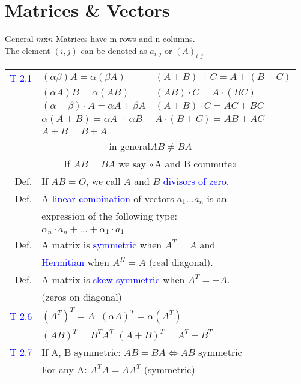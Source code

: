 \section{Matrices \& Vectors}
\begin{mainbox}{General}
$m$x$n$ Matrices have m rows and n columns.\\
The element $(i,j)$ can be denoted as $a_{i,j}$ or $(A)_{i,j}$
\smallskip\\
\setlength{\tabcolsep}{2pt}
\begin{tabular}{rll}
	\textcolor{blue}{T 2.1} & \multicolumn{1}{l|}{$(\alpha\beta)A = \alpha(\beta A)$} & $(A+B)+C = A+(B+C)$ \\
	& \multicolumn{1}{l|}{$(\alpha A)B = \alpha(AB)$} & $(AB)\cdot C = A\cdot (BC)$ \\
	& \multicolumn{1}{l|}{$(\alpha + \beta)\cdot A = \alpha A + \beta A$} & $(A+B)\cdot C = AC + BC$ \\
	& \multicolumn{1}{l|}{$\alpha (A+B) = \alpha A + \alpha B$} & $A\cdot (B+C) = AB+AC$ \\
	& \multicolumn{1}{l|}{$A+B = B+A$} & \\
	\multicolumn{3}{c}{\danger in general$AB \neq BA$}\\
	\multicolumn{3}{c}{If $AB = BA$ we say «A and B commute»}\\
	\rule{0pt}{3ex}
	Def. & \multicolumn{2}{l}{If $AB = O$, we call $A$ and $B$ \textcolor{blue}{divisors of zero}.}\\
	\rule{0pt}{3ex}
	Def. & \multicolumn{2}{l}{A \textcolor{blue}{linear combination} of vectors $a_1 ... a_n$ is an}\\
 	& \multicolumn{2}{l}{expression of the following type:}\\
 	& \multicolumn{2}{l}{$\alpha_n\cdot a_n + ... + \alpha_1\cdot a_1$}\\
 	\rule{0pt}{3ex}
	Def. & \multicolumn{2}{l}{A matrix is \textcolor{blue}{symmetric} when $A^T = A$ and}\\
	& \multicolumn{2}{l}{\textcolor{blue}{Hermitian} when $A^H = A$ (real diagonal).}\\
	\rule{0pt}{3ex}
	Def. & \multicolumn{2}{l}{A matrix is \textcolor{blue}{skew-symmetric} when $A^T = -A$.}\\
	& \multicolumn{2}{l}{(zeros on diagonal)}\\
	\rule{0pt}{3ex}
	\textcolor{blue}{T 2.6} & \multicolumn{2}{l}{$(A^T)^T = A$ \qquad\qquad $\:(\alpha A)^T = \alpha(A^T)$}\\
	& \multicolumn{2}{l}{$(AB)^T = B^TA^T$ \qquad $(A+B)^T = A^T + B^T$}\\
	\rule{0pt}{3ex}
	\textcolor{blue}{T 2.7} & \multicolumn{2}{l}{If A, B symmetric: $AB = BA \Leftrightarrow AB$ symmetric}\\
	& \multicolumn{2}{l}{For any A: $A^TA = AA^T$ (symmetric)}\\
\end{tabular}
\end{mainbox}


